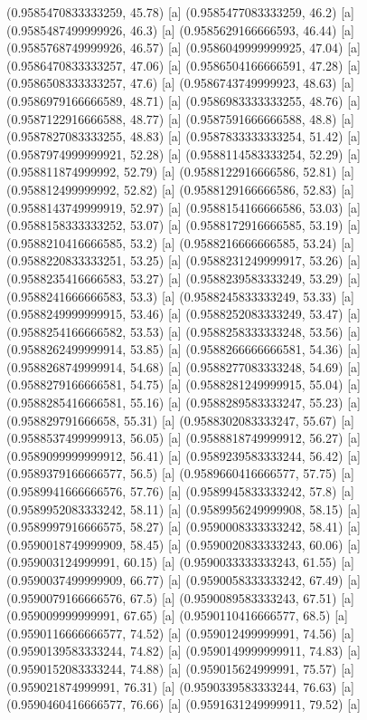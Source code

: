 {{{(0.9585470833333259, 45.78) [a] 
(0.9585477083333259, 46.2) [a] 
(0.9585487499999926, 46.3) [a] 
(0.9585629166666593, 46.44) [a] 
(0.9585768749999926, 46.57) [a] 
(0.9586049999999925, 47.04) [a] 
(0.9586470833333257, 47.06) [a] 
(0.9586504166666591, 47.28) [a] 
(0.9586508333333257, 47.6) [a] 
(0.9586743749999923, 48.63) [a] 
(0.9586979166666589, 48.71) [a] 
(0.9586983333333255, 48.76) [a] 
(0.9587122916666588, 48.77) [a] 
(0.9587591666666588, 48.8) [a] 
(0.9587827083333255, 48.83) [a] 
(0.9587833333333254, 51.42) [a] 
(0.9587974999999921, 52.28) [a] 
(0.9588114583333254, 52.29) [a] 
(0.958811874999992, 52.79) [a] 
(0.9588122916666586, 52.81) [a] 
(0.958812499999992, 52.82) [a] 
(0.9588129166666586, 52.83) [a] 
(0.9588143749999919, 52.97) [a] 
(0.9588154166666586, 53.03) [a] 
(0.9588158333333252, 53.07) [a] 
(0.9588172916666585, 53.19) [a] 
(0.9588210416666585, 53.2) [a] 
(0.9588216666666585, 53.24) [a] 
(0.9588220833333251, 53.25) [a] 
(0.9588231249999917, 53.26) [a] 
(0.9588235416666583, 53.27) [a] 
(0.9588239583333249, 53.29) [a] 
(0.9588241666666583, 53.3) [a] 
(0.9588245833333249, 53.33) [a] 
(0.9588249999999915, 53.46) [a] 
(0.9588252083333249, 53.47) [a] 
(0.9588254166666582, 53.53) [a] 
(0.9588258333333248, 53.56) [a] 
(0.9588262499999914, 53.85) [a] 
(0.9588266666666581, 54.36) [a] 
(0.9588268749999914, 54.68) [a] 
(0.9588277083333248, 54.69) [a] 
(0.9588279166666581, 54.75) [a] 
(0.9588281249999915, 55.04) [a] 
(0.9588285416666581, 55.16) [a] 
(0.9588289583333247, 55.23) [a] 
(0.958829791666658, 55.31) [a] 
(0.9588302083333247, 55.67) [a] 
(0.9588537499999913, 56.05) [a] 
(0.9588818749999912, 56.27) [a] 
(0.9589099999999912, 56.41) [a] 
(0.9589239583333244, 56.42) [a] 
(0.9589379166666577, 56.5) [a] 
(0.9589660416666577, 57.75) [a] 
(0.9589941666666576, 57.76) [a] 
(0.9589945833333242, 57.8) [a] 
(0.9589952083333242, 58.11) [a] 
(0.9589956249999908, 58.15) [a] 
(0.9589997916666575, 58.27) [a] 
(0.9590008333333242, 58.41) [a] 
(0.9590018749999909, 58.45) [a] 
(0.9590020833333243, 60.06) [a] 
(0.959003124999991, 60.15) [a] 
(0.9590033333333243, 61.55) [a] 
(0.9590037499999909, 66.77) [a] 
(0.9590058333333242, 67.49) [a] 
(0.9590079166666576, 67.5) [a] 
(0.9590089583333243, 67.51) [a] 
(0.959009999999991, 67.65) [a] 
(0.9590110416666577, 68.5) [a] 
(0.9590116666666577, 74.52) [a] 
(0.959012499999991, 74.56) [a] 
(0.9590139583333244, 74.82) [a] 
(0.9590149999999911, 74.83) [a] 
(0.9590152083333244, 74.88) [a] 
(0.959015624999991, 75.57) [a] 
(0.959021874999991, 76.31) [a] 
(0.9590339583333244, 76.63) [a] 
(0.9590460416666577, 76.66) [a] 
(0.9591631249999911, 79.52) [a] 
}}}
